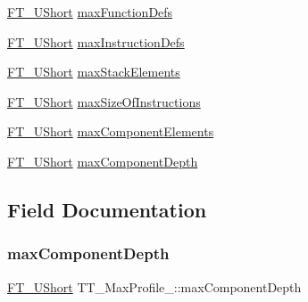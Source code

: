 \begin{DoxyCompactItemize}
\item 
\hyperlink{fttypes_8h_a937f6c17cf5ffd09086d8610c37b9f58}{F\+T\+\_\+\+U\+Short} \hyperlink{struct_t_t___max_profile___acc24e822a62bbfaa86d36f691fcde60b}{max\+Function\+Defs}
\item 
\hyperlink{fttypes_8h_a937f6c17cf5ffd09086d8610c37b9f58}{F\+T\+\_\+\+U\+Short} \hyperlink{struct_t_t___max_profile___a3f7bd433baede417293415cf60f20d8f}{max\+Instruction\+Defs}
\item 
\hyperlink{fttypes_8h_a937f6c17cf5ffd09086d8610c37b9f58}{F\+T\+\_\+\+U\+Short} \hyperlink{struct_t_t___max_profile___a2df9b9ff2a5a9daaa7c3d40fe024637f}{max\+Stack\+Elements}
\item 
\hyperlink{fttypes_8h_a937f6c17cf5ffd09086d8610c37b9f58}{F\+T\+\_\+\+U\+Short} \hyperlink{struct_t_t___max_profile___ac458411198b09d303ec8ae206e6926b6}{max\+Size\+Of\+Instructions}
\item 
\hyperlink{fttypes_8h_a937f6c17cf5ffd09086d8610c37b9f58}{F\+T\+\_\+\+U\+Short} \hyperlink{struct_t_t___max_profile___a110e6d735610c6d8fd89221d03440c32}{max\+Component\+Elements}
\item 
\hyperlink{fttypes_8h_a937f6c17cf5ffd09086d8610c37b9f58}{F\+T\+\_\+\+U\+Short} \hyperlink{struct_t_t___max_profile___a9ae1f117c954e0711b03f1675d6191d9}{max\+Component\+Depth}
\end{DoxyCompactItemize}


\subsection{Field Documentation}
\mbox{\label{struct_t_t___max_profile___a9ae1f117c954e0711b03f1675d6191d9}} 
\subsubsection{\texorpdfstring{max\+Component\+Depth}{maxComponentDepth}}
{\footnotesize\ttfamily \hyperlink{fttypes_8h_a937f6c17cf5ffd09086d8610c37b9f58}{F\+T\+\_\+\+U\+Short} T\+T\+\_\+\+Max\+Profile\+\_\+\+::max\+Component\+Depth}

\mbox{\label{struct_t_t___max_profile___a110e6d735610c6d8fd89221d03440c32}} 
